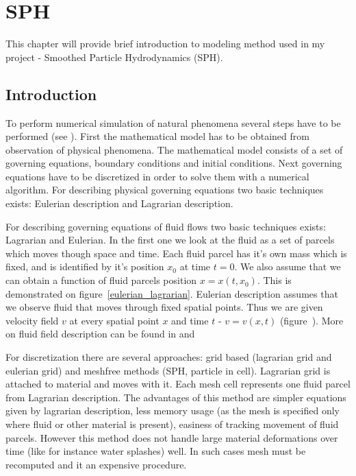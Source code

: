 

\chapter{SPH}
\label{chap:sph}


\graphicspath{{sph/figures/}}

This chapter will provide brief introduction to modeling method used in my project - Smoothed Particle Hydrodynamics (SPH).

\section{Introduction}
To perform numerical simulation of natural phenomena several steps have to be performed (see \cite[section 1.1.2]{Liu}). First the mathematical model has to be obtained from observation of physical phenomena. The mathematical model consists of a set of governing equations, boundary conditions and initial conditions. Next governing equations have to be discretized in order to solve them with a numerical algorithm.
For describing physical governing equations two basic techniques exists: Eulerian description and Lagrarian description.

For describing governing equations of fluid flows two basic techniques exists: Lagrarian and Eulerian. In the first one we look at the fluid as a set of parcels which moves though space and time. Each fluid parcel has it's own mass which is fixed, and is identified by it's position $x_0$ at time $t = 0$. We also assume that we can obtain a function of fluid parcels position $x = x(t, x_0)$. This is demonstrated on figure~\ref{eulerian_lagrarian}.
Eulerian description assumes that we observe fluid that moves through fixed spatial points. Thus we are given velocity field $v$ at every spatial point $x$ and time $t$ - $v = v(x, t)$ (figure~\cite{eulerian_lagrarian}). 
More on fluid field description can be found in \cite[section 2.1]{Hauke2008} and \cite{Price06}


For discretization there are several approaches: grid based (lagrarian grid and eulerian grid) and meshfree methods (SPH, particle in cell).
Lagrarian grid is attached to material and moves with it. Each mesh cell represents one fluid parcel from Lagrarian description. The advantages of this method are simpler equations given by lagrarian description, less memory usage (as the mesh is specified only where fluid or other material is present), easiness of tracking movement of fluid parcels. However this method does not handle large material deformations over time (like for instance water splashes) well. In such cases mesh must be recomputed and it an expensive procedure.


